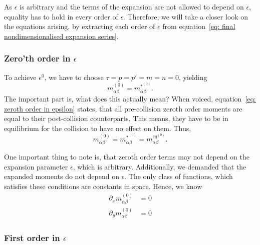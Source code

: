 As $\epsilon$ is arbitrary and the terms of the expansion are not allowed to depend on $\epsilon$, equality has to hold in every order of $\epsilon$.
Therefore, we will take a closer look on the equations arising, by extracting each order of $\epsilon$ from equation~\eqref{eq: final nondimensionalised expansion series}.

\subsubsection{Zero'th order in \texorpdfstring{$\epsilon$}{epsilon}}
\label{subs: Zeroth order in epsilon}

To achieve $\epsilon^0$, we have to choose $\tau=p=p'=m=n=0$, yielding
\begin{equation}
  \label{eq: zeroth order in epsilon}
  m_{\alpha\beta}^{(0)} = m_{\alpha\beta}^{*^{(0)}}.
\end{equation}
The important part is, what does this actually mean?
When voiced, equation~\eqref{eq: zeroth order in epsilon} states, that all pre-collision zeroth order moments are equal to their post-collision counterparts.
This means, they have to be in equilibrium for the collision to have no effect on them.
Thus,
\begin{equation}
  \label{eq: zeroth order invariant}
  m_{\alpha\beta}^{(0)} = m_{\alpha\beta}^{*^{(0)}} = m_{\alpha\beta}^{eq^{(0)}}.
\end{equation}

One important thing to note is, that zeroth order terms may not depend on the expansion parameter $\epsilon$, which is arbitrary.
Additionally, we demanded that the expanded moments do not depend on $\epsilon$.
The only class of functions, which satisfies these conditions are constants in space.
Hence, we know
\begin{equation}
  \label{eq: derivative of zeroth order}
  \begin{aligned}
    \partial_x m_{\alpha\beta}^{(0)} &= 0 \\
    \partial_y m_{\alpha\beta}^{(0)} &= 0
  \end{aligned}
\end{equation}

\subsubsection{First order in \texorpdfstring{$\epsilon$}{epsilon}}
\label{subs: First order in epsilon}

